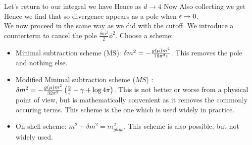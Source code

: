 \documentclass{article}
\begin{document}
Let's return to our integral 
we have 
Hence as $d \to 4$
Now 
Also collecting we get 
Hence we find that 
so divergence appears as a pole when $\epsilon \to 0$. \\
We now proceed in the same way as we did with the cutoff. We introduce a counterterm to cancel the pole $\frac{\delta m^2}{2}\phi^2$. Choose a scheme:
\begin{itemize}
    \item Minimal subtraction scheme (MS): $\delta m^2 = - \frac{g(\mu) m^2}{16 \pi^2 \epsilon}$. This removes the pole and nothing else. 
    \item Modified Minimal subtraction scheme ($\overline{MS}$) : $\delta m^2 = -\frac{g(\mu) m^2}{32 \pi^2}\left(\frac{2}{\epsilon} -\gamma + \log 4\pi \right)$. This is not better or worse from a physical point of view, but is mathematically convenient as it removes the commonly occuring terms. This scheme is the one which is used widely in practice. 
    \item On shell scheme: $m^2 + \delta m^2 = m_{phys}^2$. This scheme is also possible, but not widely used. 
\end{itemize}
\end{document}
